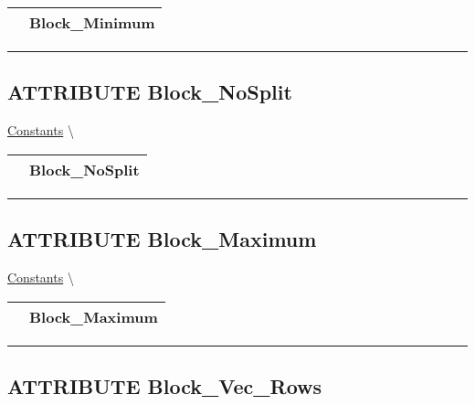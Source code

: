 {\renewcommand{\arraystretch}{1.5}
\begin{tabularx}{\textwidth}{|>{\raggedright\arraybackslash}l|X|}
\hline
\hspace{0pt}\mytexttt{\color{red} } & \textbf{Block\_Minimum} \\
\hline
\end{tabularx}
}

\par


\rule{\linewidth}{0.5pt}
\subsection*{\textsf{\colorbox{headtoc}{\color{white} ATTRIBUTE}
Block\_NoSplit}}

\hypertarget{ecldoc:pbblas.constants.block_nosplit}{}
\hspace{0pt} \hyperlink{ecldoc:PBblas.Constants}{Constants} \textbackslash 

{\renewcommand{\arraystretch}{1.5}
\begin{tabularx}{\textwidth}{|>{\raggedright\arraybackslash}l|X|}
\hline
\hspace{0pt}\mytexttt{\color{red} } & \textbf{Block\_NoSplit} \\
\hline
\end{tabularx}
}

\par


\rule{\linewidth}{0.5pt}
\subsection*{\textsf{\colorbox{headtoc}{\color{white} ATTRIBUTE}
Block\_Maximum}}

\hypertarget{ecldoc:pbblas.constants.block_maximum}{}
\hspace{0pt} \hyperlink{ecldoc:PBblas.Constants}{Constants} \textbackslash 

{\renewcommand{\arraystretch}{1.5}
\begin{tabularx}{\textwidth}{|>{\raggedright\arraybackslash}l|X|}
\hline
\hspace{0pt}\mytexttt{\color{red} } & \textbf{Block\_Maximum} \\
\hline
\end{tabularx}
}

\par


\rule{\linewidth}{0.5pt}
\subsection*{\textsf{\colorbox{headtoc}{\color{white} ATTRIBUTE}
Block\_Vec\_Rows}}

